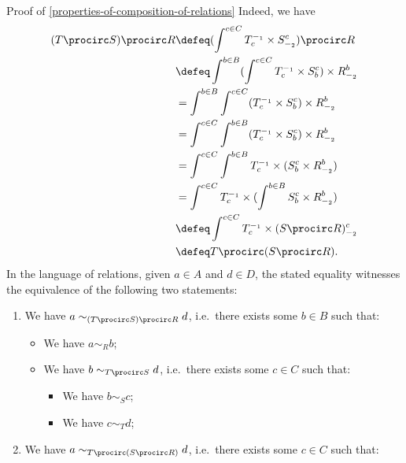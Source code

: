 \begin{Proof}{Proof of \cref{properties-of-composition-of-relations}}
    Indeed, we have
    \begin{align*}
        (T\procirc S)\procirc R &\defeq (\int^{c\in C}T^{-_{1}}_{c}\times S^{c}_{-_{2}})\procirc R\\
                                &\defeq \int^{b\in B}(\int^{c\in C}T^{-_{1}}_{c}\times S^{c}_{b})\times R^{b}_{-_{2}}\\
                                &=      \int^{b\in B}\int^{c\in C}(T^{-_{1}}_{c}\times S^{c}_{b})\times R^{b}_{-_{2}}\\
                                &=      \int^{c\in C}\int^{b\in B}(T^{-_{1}}_{c}\times S^{c}_{b})\times R^{b}_{-_{2}}\\
                                &=      \int^{c\in C}\int^{b\in B}T^{-_{1}}_{c}\times(S^{c}_{b}\times R^{b}_{-_{2}})\\
                                &=      \int^{c\in C}T^{-_{1}}_{c}\times(\int^{b\in B}S^{c}_{b}\times R^{b}_{-_{2}})\\
                                &\defeq \int^{c\in C}T^{-_{1}}_{c}\times(S\procirc R)^{c}_{-_{2}}\\
                                &\defeq T\procirc(S\procirc R).
    \end{align*}
    In the language of relations, given $a\in A$ and $d\in D$, the stated equality witnesses the equivalence of the following two statements:
    \begin{enumerate}
        \item\label{proof-of-properties-of-composition-of-relations-associativity-1}We have $a\sim_{(T\procirc S)\procirc R}d$, i.e.\ there exists some $b\in B$ such that:
            \begin{itemize}
                \item We have $a\sim_{R}b$;
                \item We have $b\sim_{T\procirc S}d$, i.e.\ there exists some $c\in C$ such that:
                    \begin{itemize}
                        \item We have $b\sim_{S}c$;
                        \item We have $c\sim_{T}d$;
                    \end{itemize}
            \end{itemize}
        \item\label{proof-of-properties-of-composition-of-relations-associativity-2}We have $a\sim_{T\procirc(S\procirc R)}d$, i.e.\ there exists some $c\in C$ such that:

\end{enumerate}
\end{Proof}
